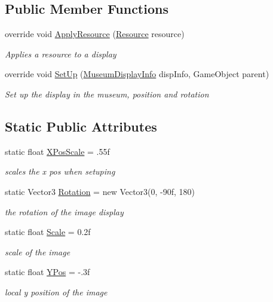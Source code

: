 \subsection*{Public Member Functions}
\begin{DoxyCompactItemize}
\item 
override void \mbox{\hyperlink{class_image_display_a733a86ef960e7836442e858b5d52dbec}{Apply\+Resource}} (\mbox{\hyperlink{class_resource}{Resource}} resource)
\begin{DoxyCompactList}\small\item\em Applies a resource to a display \end{DoxyCompactList}\item 
override void \mbox{\hyperlink{class_image_display_a28fead7caeeb12490d26fae943da6a1e}{Set\+Up}} (\mbox{\hyperlink{class_museum_display_info}{Museum\+Display\+Info}} disp\+Info, Game\+Object parent)
\begin{DoxyCompactList}\small\item\em Set up the display in the museum, position and rotation \end{DoxyCompactList}\end{DoxyCompactItemize}
\subsection*{Static Public Attributes}
\begin{DoxyCompactItemize}
\item 
static float \mbox{\hyperlink{class_image_display_ae1044419b2f9dfa64d75329e48e312de}{X\+Pos\+Scale}} = .\+55f
\begin{DoxyCompactList}\small\item\em scales the x pos when setuping \end{DoxyCompactList}\item 
static Vector3 \mbox{\hyperlink{class_image_display_a8ecd7f162065170c3f5cbcf906b11873}{Rotation}} = new Vector3(0, -\/90f, 180)
\begin{DoxyCompactList}\small\item\em the rotation of the image display \end{DoxyCompactList}\item 
static float \mbox{\hyperlink{class_image_display_aac7ba9a36c272ad5c6873119b521ed5e}{Scale}} = 0.\+2f
\begin{DoxyCompactList}\small\item\em scale of the image \end{DoxyCompactList}\item 
static float \mbox{\hyperlink{class_image_display_ac0ef458ef2e417549068a631e35f39d6}{Y\+Pos}} = -\/.\+3f
\begin{DoxyCompactList}\small\item\em local y position of the image \end{DoxyCompactList}\end{DoxyCompactItemize}
